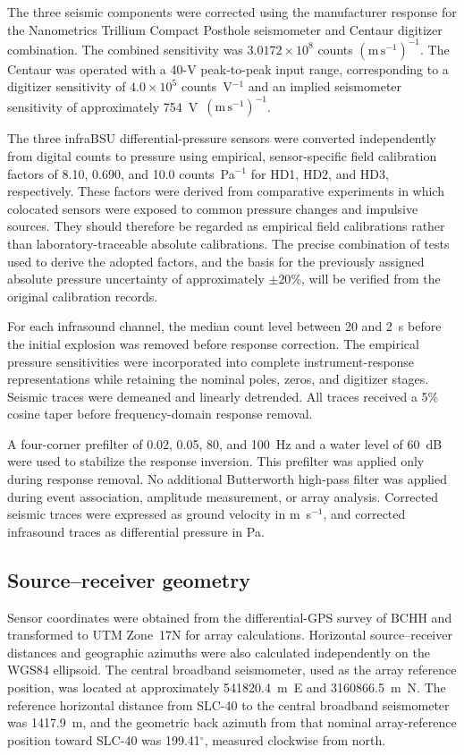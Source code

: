\documentclass[]{seismica}
\begin{document}
The three seismic components were corrected using the manufacturer response
for the Nanometrics Trillium Compact Posthole seismometer and Centaur digitizer
combination. The combined sensitivity was
$3.0172\times10^8$ counts $(\mathrm{m\,s^{-1}})^{-1}$. The Centaur was
operated with a 40-V peak-to-peak input range, corresponding to a digitizer
sensitivity of $4.0\times10^5$ counts~V$^{-1}$ and an implied seismometer
sensitivity of approximately 754~V~$(\mathrm{m\,s^{-1}})^{-1}$.

The three infraBSU differential-pressure sensors were converted independently
from digital counts to pressure using empirical, sensor-specific field
calibration factors of 8.10, 0.690, and 10.0 counts~Pa$^{-1}$ for HD1, HD2,
and HD3, respectively. These factors were derived from comparative experiments
in which colocated sensors were exposed to common pressure changes and
impulsive sources. They should therefore be regarded as empirical field
calibrations rather than laboratory-traceable absolute calibrations. The
precise combination of tests used to derive the adopted factors, and the basis
for the previously assigned absolute pressure uncertainty of approximately
$\pm20\%$, will be verified from the original calibration records.

For each infrasound channel, the median count level between 20 and 2~s before
the initial explosion was removed before response correction. The empirical
pressure sensitivities were incorporated into complete instrument-response
representations while retaining the nominal poles, zeros, and digitizer
stages. Seismic traces were demeaned and linearly detrended. All traces received
a 5\% cosine taper before frequency-domain response removal.

A four-corner prefilter of 0.02, 0.05, 80, and 100~Hz and a water level of
60~dB were used to stabilize the response inversion. This prefilter was applied
only during response removal. No additional Butterworth high-pass filter was
applied during event association, amplitude measurement, or array analysis.
Corrected seismic traces were expressed as ground velocity in
m~s$^{-1}$, and corrected infrasound traces as differential pressure in Pa.


\subsection{Source--receiver geometry}

Sensor coordinates were obtained from the differential-GPS survey of BCHH and
transformed to UTM Zone~17N for array calculations. Horizontal
source--receiver distances and geographic azimuths were also calculated
independently on the WGS84 ellipsoid. The central broadband seismometer, used
as the array reference position, was located at approximately 541820.4~m~E and
3160866.5~m~N. The reference horizontal distance from SLC-40 to the central broadband
seismometer was 1417.9~m, and the geometric back azimuth from that nominal
array-reference position toward SLC-40 was 199.41$^\circ$, measured clockwise
from north.
\end{document}
